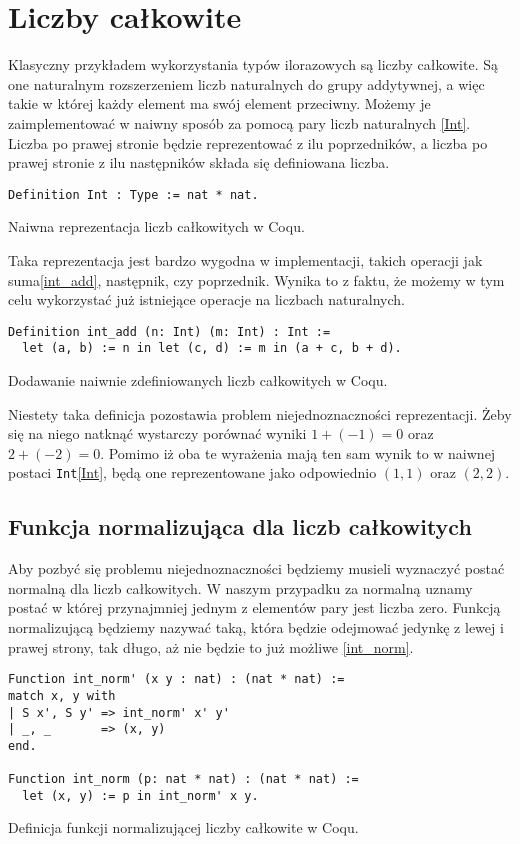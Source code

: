 \section{Liczby całkowite}
Klasyczny przykładem wykorzystania typów ilorazowych są liczby całkowite. Są one naturalnym rozszerzeniem liczb naturalnych do grupy addytywnej, a więc takie w której każdy element ma swój element przeciwny. Możemy je zaimplementować w naiwny sposób za pomocą pary liczb naturalnych \ref{Int}. Liczba po prawej stronie będzie reprezentować z ilu poprzedników, a liczba po prawej stronie z ilu następników składa się definiowana liczba.
\begin{code}
\begin{verbatim}
Definition Int : Type := nat * nat.
\end{verbatim}
\caption{Naiwna reprezentacja liczb całkowitych w Coqu.}
\label{Int}
\end{code}
Taka reprezentacja jest bardzo wygodna w implementacji, takich operacji jak suma\ref{int_add}, następnik, czy poprzednik. Wynika to z faktu, że możemy w tym celu wykorzystać już istniejące operacje na liczbach naturalnych.  
\begin{code}
\begin{verbatim}
Definition int_add (n: Int) (m: Int) : Int :=
  let (a, b) := n in let (c, d) := m in (a + c, b + d).
\end{verbatim}
\caption{Dodawanie naiwnie zdefiniowanych liczb całkowitych w Coqu.}
\label{int_add}
\end{code}
Niestety taka definicja pozostawia problem niejednoznaczności reprezentacji. Żeby się na niego natknąć wystarczy porównać wyniki $1 + (-1) = 0$ oraz $2 + (-2) = 0$. Pomimo iż oba te wyrażenia mają ten sam wynik to w naiwnej postaci \texttt{Int}\ref{Int}, będą one reprezentowane jako odpowiednio $(1, 1)$ oraz $(2, 2)$.
\subsection{Funkcja normalizująca dla liczb całkowitych}
Aby pozbyć się problemu niejednoznaczności będziemy musieli wyznaczyć postać normalną dla liczb całkowitych. W naszym przypadku za normalną uznamy postać w której przynajmniej jednym z elementów pary jest liczba zero. Funkcją normalizującą będziemy nazywać taką, która będzie odejmować jedynkę z lewej i prawej strony, tak długo, aż nie będzie to już możliwe \ref{int_norm}.
\begin{code}
\begin{verbatim}
Function int_norm' (x y : nat) : (nat * nat) :=
match x, y with
| S x', S y' => int_norm' x' y'
| _, _       => (x, y)
end.

Function int_norm (p: nat * nat) : (nat * nat) := 
  let (x, y) := p in int_norm' x y.
\end{verbatim}
\caption{Definicja funkcji normalizującej liczby całkowite w Coqu.}
\label{int_norm}
\end{code}

